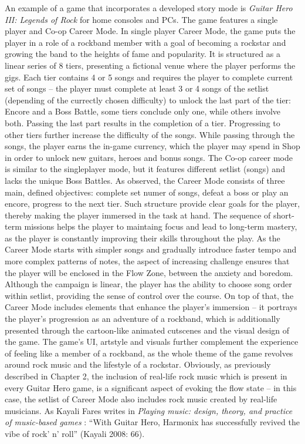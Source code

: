 An example of a game that incorporates a developed story mode is \textit{Guitar Hero III: Legends of Rock} for home consoles and PCs. The game features a single player and Co-op Career Mode. In single player Career Mode, the game puts the player in a role of a rockband member with a goal of becoming a rockstar and growing the band to the heights of fame and popularity. It is structured as a linear series of 8 tiers, presenting a fictional venue where the player performs the gigs. Each tier contains 4 or 5 songs and requires the player to complete current set of songs -- the player must complete at least 3 or 4 songs of the setlist (depending of the currectly chosen difficulty) to unlock the last part of the tier: Encore and a Boss Battle, some tiers conclude only one, while others involve both. Passing the last part results in the completion of a tier. Progressing to other tiers further increase the difficulty of the songs. While passing through the songs, the player earns the in-game currency, which the player may spend in Shop in order to unlock new guitars, heroes and bonus songs. The Co-op career mode is similar to the singleplayer mode, but it features different setlist (songs) and lacks the unique Boss Battles. As observed, the Career Mode consists of three main, defined objectives: complete set numer of songs, defeat a boss or play an encore, progress to the next tier. Such structure provide clear goals for the player, thereby making the player immersed in the task at hand. The sequence of short-term missions helps the player to maintaing focus and lead to long-term mastery, as the player is constantly improving their skills throughout the play. As the Career Mode starts with simpler songs and gradually introduce faster tempo and more complex patterns of notes, the aspect of increasing challenge ensures that the player will be enclosed in the Flow Zone, between the anxiety and boredom. Although the campaign is linear, the player has the ability to choose song order within setlist, providing the sense of control over the course. On top of that, the Career Mode includes elements that enhance the player’s immersion -- it portrays the player’s progression as an adventure of a rockband, which is additionally presented through the cartoon-like animated cutscenes and the visual design of the game. The game’s UI, artstyle and visuals further complement the experience of feeling like a member of a rockband, as the whole theme of the game revolves around rock music and the lifestyle of a rockstar. Obviously, as previously described in Chapter 2, the inclusion of real-life rock music which is present in every Guitar Hero game, is a significant aspect of evoking the flow state -- in this case, the setlist of Career Mode also includes rock music created by real-life musicians. As Kayali Fares writes in \textit{Playing music: design, theory, and practice of music-based games} \cite{faresplayingmusic}: “With Guitar Hero, Harmonix has successfully revived the vibe of rock’ n’ roll” (Kayali 2008: 66).

